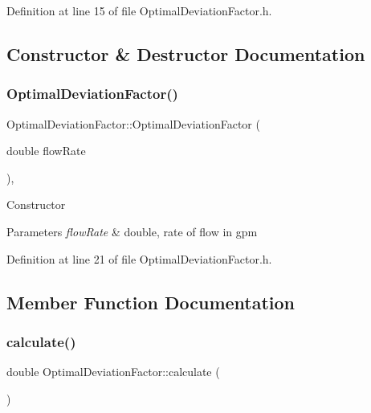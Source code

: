 Definition at line 15 of file Optimal\+Deviation\+Factor.\+h.



\subsection{Constructor \& Destructor Documentation}
\mbox{\label{class_optimal_deviation_factor_a61e6acfd31d44bc1f2f622407ba1e857}} 
\subsubsection{\texorpdfstring{Optimal\+Deviation\+Factor()}{OptimalDeviationFactor()}}
{\footnotesize\ttfamily Optimal\+Deviation\+Factor\+::\+Optimal\+Deviation\+Factor (\begin{DoxyParamCaption}\item[{double}]{flow\+Rate }\end{DoxyParamCaption})\hspace{0.3cm}{\ttfamily [inline]}, {\ttfamily [explicit]}}

Constructor 
\begin{DoxyParams}{Parameters}
{\em flow\+Rate} & double, rate of flow in gpm \\
\hline
\end{DoxyParams}


Definition at line 21 of file Optimal\+Deviation\+Factor.\+h.



\subsection{Member Function Documentation}
\mbox{\label{class_optimal_deviation_factor_aaa6687bb46d275c4cbcfe44caf895a37}} 
\subsubsection{\texorpdfstring{calculate()}{calculate()}}
{\footnotesize\ttfamily double Optimal\+Deviation\+Factor\+::calculate (\begin{DoxyParamCaption}{ }\end{DoxyParamCaption})}




